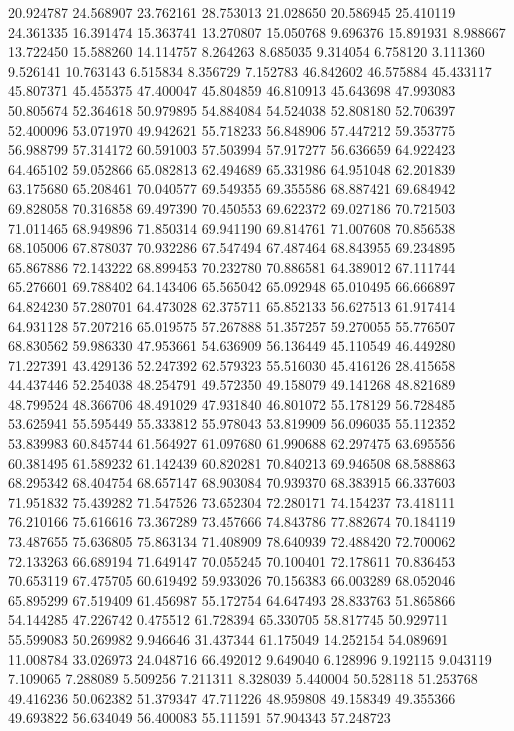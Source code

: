 20.924787
24.568907
23.762161
28.753013
21.028650
20.586945
25.410119
24.361335
16.391474
15.363741
13.270807
15.050768
9.696376
15.891931
8.988667
13.722450
15.588260
14.114757
8.264263
8.685035
9.314054
6.758120
3.111360
9.526141
10.763143
6.515834
8.356729
7.152783
46.842602
46.575884
45.433117
45.807371
45.455375
47.400047
45.804859
46.810913
45.643698
47.993083
50.805674
52.364618
50.979895
54.884084
54.524038
52.808180
52.706397
52.400096
53.071970
49.942621
55.718233
56.848906
57.447212
59.353775
56.988799
57.314172
60.591003
57.503994
57.917277
56.636659
64.922423
64.465102
59.052866
65.082813
62.494689
65.331986
64.951048
62.201839
63.175680
65.208461
70.040577
69.549355
69.355586
68.887421
69.684942
69.828058
70.316858
69.497390
70.450553
69.622372
69.027186
70.721503
71.011465
68.949896
71.850314
69.941190
69.814761
71.007608
70.856538
68.105006
67.878037
70.932286
67.547494
67.487464
68.843955
69.234895
65.867886
72.143222
68.899453
70.232780
70.886581
64.389012
67.111744
65.276601
69.788402
64.143406
65.565042
65.092948
65.010495
66.666897
64.824230
57.280701
64.473028
62.375711
65.852133
56.627513
61.917414
64.931128
57.207216
65.019575
57.267888
51.357257
59.270055
55.776507
68.830562
59.986330
47.953661
54.636909
56.136449
45.110549
46.449280
71.227391
43.429136
52.247392
62.579323
55.516030
45.416126
28.415658
44.437446
52.254038
48.254791
49.572350
49.158079
49.141268
48.821689
48.799524
48.366706
48.491029
47.931840
46.801072
55.178129
56.728485
53.625941
55.595449
55.333812
55.978043
53.819909
56.096035
55.112352
53.839983
60.845744
61.564927
61.097680
61.990688
62.297475
63.695556
60.381495
61.589232
61.142439
60.820281
70.840213
69.946508
68.588863
68.295342
68.404754
68.657147
68.903084
70.939370
68.383915
66.337603
71.951832
75.439282
71.547526
73.652304
72.280171
74.154237
73.418111
76.210166
75.616616
73.367289
73.457666
74.843786
77.882674
70.184119
73.487655
75.636805
75.863134
71.408909
78.640939
72.488420
72.700062
72.133263
66.689194
71.649147
70.055245
70.100401
72.178611
70.836453
70.653119
67.475705
60.619492
59.933026
70.156383
66.003289
68.052046
65.895299
67.519409
61.456987
55.172754
64.647493
28.833763
51.865866
54.144285
47.226742
0.475512
61.728394
65.330705
58.817745
50.929711
55.599083
50.269982
9.946646
31.437344
61.175049
14.252154
54.089691
11.008784
33.026973
24.048716
66.492012
9.649040
6.128996
9.192115
9.043119
7.109065
7.288089
5.509256
7.211311
8.328039
5.440004
50.528118
51.253768
49.416236
50.062382
51.379347
47.711226
48.959808
49.158349
49.355366
49.693822
56.634049
56.400083
55.111591
57.904343
57.248723

